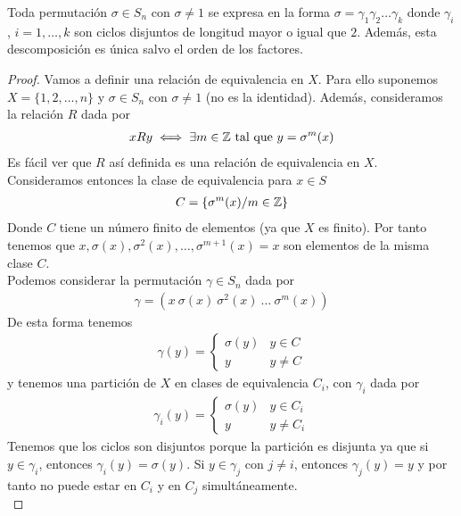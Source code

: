  \begin{teo}
    Toda permutación $\sigma \in S_n$ con $\sigma \neq 1$ se expresa en la forma $\sigma=\gamma_1 \gamma_2 \dots \gamma_k$ donde $\gamma_i$, $i=1,\dots,k$ son ciclos disjuntos de longitud mayor o igual que $2$. Además, esta descomposición es única salvo el orden de los factores.
    \begin{proof}
        Vamos a definir una relación de equivalencia en $X$. Para ello suponemos $X=\{1,2,\dots,n\}$ y $\sigma\in S_n$ con $\sigma\neq 1$ (no es la identidad). Además, consideramos la relación $R$ dada por 
        \begin{gather*}
            xRy \iff \exists m\in \mathbb{Z} \text{ tal que } y=\sigma^m(x)
        \end{gather*}
        Es fácil ver que $R$ así definida es una relación de equivalencia en $X$. Consideramos entonces la clase de equivalencia para $x\in S$
        \begin{gather*}
            C=\{\sigma^m(x) / m\in \mathbb{Z}\}
        \end{gather*}
        Donde $C$ tiene un número finito de elementos (ya que $X$ es finito). Por tanto tenemos que $x,\sigma(x),\sigma^2(x),\dots,\sigma^{m+1}(x)=x$ son elementos de la misma clase $C$.\\

        Podemos considerar la permutación $\gamma \in S_n$ dada por
        \begin{gather*}
            \gamma=(x\ \sigma(x)\ \sigma^2(x)\ \dots\ \sigma^m(x))
        \end{gather*}
        De esta forma tenemos
        \begin{gather*}
            \gamma(y)=\left\{ 
            \begin{array}{ll}
                \sigma(y) & y\in C\\
                y & y\neq C
            \end{array}
            \right.
        \end{gather*}
        y tenemos una partición de $X$ en clases de equivalencia $C_i$, con $\gamma_i$ dada por
        \begin{gather*}
            \gamma_i(y)=\left\{ 
            \begin{array}{ll}
                \sigma(y) & y\in C_i\\
                y & y\neq C_i
            \end{array}
            \right.
        \end{gather*}
        Tenemos que los ciclos son disjuntos porque la partición es disjunta ya que si $y\in \gamma_i$, entonces $\gamma_i(y)=\sigma(y)$. Si $y\in \gamma_j$ con $j\neq i$, entonces $\gamma_j(y)=y$ y por tanto no puede estar en $C_i$ y en $C_j$ simultáneamente.\\


\end{proof}
\end{teo}
